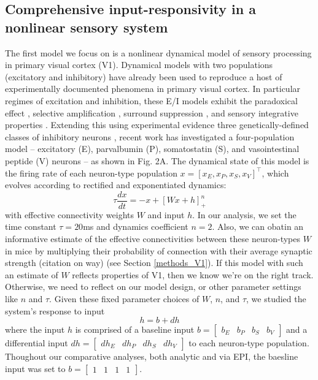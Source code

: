 \documentclass[11pt]{article}
\begin{document}
\subsection{Comprehensive input-responsivity in a nonlinear sensory system} \label{results_V1}
The first model we focus on is a nonlinear dynamical model of sensory processing in primary visual cortex (V1).
Dynamical models with two populations (excitatory and inhibitory) have already been used to reproduce a host of experimentally documented phenomena in primary visual cortex.  
In particular regimes of excitation and inhibition, these E/I models exhibit the paradoxical effect \cite{tsodyks1997paradoxical}, selective amplification \cite{murphy2009balanced}, surround suppression \cite{ozeki2009inhibitory}, and  sensory integrative properties \cite{rubin2015stabilized}.  
Extending this using experimental evidence three genetically-defined classes of inhibitory neurons \cite{markram2004interneurons, rudy2011three}, recent work \cite{litwin2016inhibitory} has investigated a four-population model --  excitatory (E), parvalbumin (P), somatostatin (S), and vasointestinal peptide (V) neurons -- as shown in Fig. 2A.
The dynamical state of this model is the firing rate of each neuron-type population $x = \left[x_E, x_P , x_S, x_V \right]^\top$, which evolves according to rectified and exponentiated dynamics:
\begin{equation}
\tau \frac{dx}{dt} = -x + [W x+ h]_+^n
\end{equation}
with effective connectivity weights $W$ and input $h$.  In our analysis, we set the time constant $\tau = 20$ms and dynamics coefficient $n = 2$.  
Also, we can obatin an informative estimate of the effective connectivities between these neuron-types $W$ in mice by multiplying their probability of connection with their average synaptic strength \cite{allen} (citation on way) (see Section \ref{methods_V1}).
If this model with such an estimate of $W$ reflects properties of V1, then we know we're on the right track.
Otherwise, we need to reflect on our model design, or other parameter settings like $n$ and $\tau$.
Given these fixed parameter choices of $W$, $n$, and $\tau$, we studied the system's response to input
\begin{equation}
h = b + dh
\end{equation} 
where the input $h$ is comprised of a baseline input $b = \begin{bmatrix} b_E & b_P & b_S & b_V \end{bmatrix}$ and a differential input $dh = \begin{bmatrix} dh_E & dh_P & dh_S & dh_V \end{bmatrix}$ to each neuron-type population.  Thoughout our comparative analyses, both analytic and via EPI, the baesline input was set to $b = \begin{bmatrix} 1 & 1 & 1 & 1 \end{bmatrix}$.  
\end{document}
